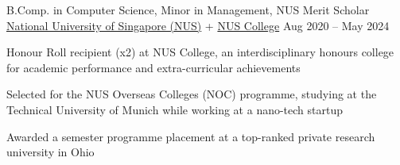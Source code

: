 
\begin{cventries}

  \cventry
    {B.Comp. in Computer Science, Minor in Management, NUS Merit Scholar} %
    {\href{https://www.nus.edu.sg/}{National University of Singapore (NUS)} + \href{https://nuscollege.nus.edu.sg/}{NUS College}} %
    {} %
    {Aug 2020 -- May 2024} %
    {
      \begin{cvitems} %
        \item {Honour Roll recipient (x2) at NUS College, an interdisciplinary honours college for academic performance and extra-curricular achievements}
        \item {Selected for the NUS Overseas Colleges (NOC) programme, studying at the Technical University of Munich while working at a nano-tech startup}
        \item {Awarded a semester programme placement at a top-ranked private research university in Ohio}
      \end{cvitems}
    }

\end{cventries}
